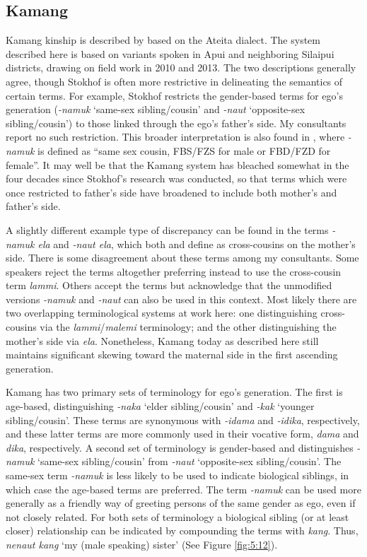 \subsection{Kamang}\label{sect_kamang}
Kamang kinship is described by \citet{Stokhof1977} based on the Ateita dialect. The system described here is based on variants spoken in Apui and neighboring Silaipui districts, drawing on field work in 2010 and 2013. The two descriptions generally agree, though Stokhof is often more restrictive in delineating the semantics of certain terms. For example, Stokhof restricts the gender-based terms for ego's generation (\textit{-namuk} `same-sex sibling/cousin' and \textit{-naut} `opposite-sex sibling/cousin') to those linked through the ego's father's side. My consultants report no such restriction. This broader interpretation is also found in \citet{SchapperEtAl2011kamus}, where \textit{-namuk} is defined as ``same sex cousin, FBS/FZS for male or FBD/FZD for female''. It may well be that the Kamang system has bleached somewhat in the four decades since Stokhof's research was conducted, so that terms which were once restricted to father's side have broadened to include both mother's and father's side.

A slightly different example type of discrepancy can be found in the terms \textit{-namuk ela} and \textit{-naut ela}, which both \citet{Stokhof1977} and   \citet{SchapperEtAl2011kamus} define as cross-cousins on the mother's side. There is some disagreement about these terms among my consultants. Some speakers reject the terms altogether preferring instead to use the cross-cousin term \textit{lammi}. Others accept the terms but acknowledge that the unmodified versions \textit{-namuk} and \textit{-naut} can also be used in this context. Most likely there are two overlapping terminological systems at work here: one distinguishing cross-cousins via the \textit{lammi}/\textit{malemi} terminology; and the other distinguishing the mother's side via \textit{ela}. Nonetheless, Kamang today as described here still maintains significant skewing toward the maternal side in the first ascending generation. 

Kamang has two primary sets of terminology for ego's generation. The first is age-based, distinguishing \textit{-naka} `elder sibling/cousin' and \textit{-kak} `younger sibling/cousin'. These terms are synonymous with \textit{-idama} and \textit{-idika}, respectively, and these latter terms are more commonly used in their vocative form, \textit{dama} and \textit{dika}, respectively. A second set of terminology is gender-based and distinguishes \textit{-namuk} `same-sex sibling/cousin' from \textit{-naut} `opposite-sex sibling/cousin'. The same-sex term \textit{-namuk} is less likely to be used to indicate biological siblings, in which case the age-based terms are preferred. The term \textit{-namuk} can be used more generally as a friendly way of greeting persons of the same gender as ego, even if not closely related. For both sets of terminology a biological sibling (or at least closer) relationship can be indicated by compounding the terms with \textit{kang}. Thus, \textit{nenaut kang} `my (male speaking) sister' (See Figure \ref{fig:5:12}). 


